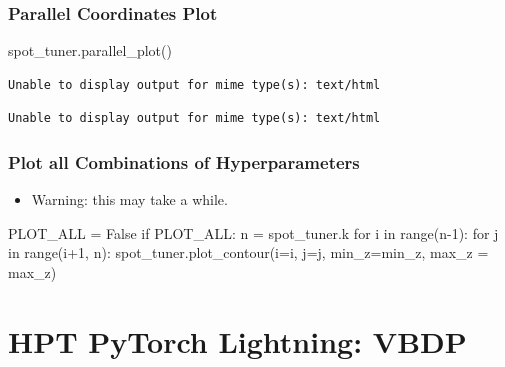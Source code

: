 \documentclass[
  letterpaper,
  DIV=11,
  numbers=noendperiod]{scrreprt}
\newenvironment{Shaded}{\begin{snugshade}}{\end{snugshade}}
\newcommand{\BuiltInTok}[1]{\textcolor[rgb]{0.00,0.23,0.31}{#1}}
\newcommand{\ControlFlowTok}[1]{\textcolor[rgb]{0.00,0.23,0.31}{#1}}
\newcommand{\DecValTok}[1]{\textcolor[rgb]{0.68,0.00,0.00}{#1}}
\newcommand{\KeywordTok}[1]{\textcolor[rgb]{0.00,0.23,0.31}{#1}}
\newcommand{\NormalTok}[1]{\textcolor[rgb]{0.00,0.23,0.31}{#1}}
\newcommand{\OperatorTok}[1]{\textcolor[rgb]{0.37,0.37,0.37}{#1}}
\newcommand{\VariableTok}[1]{\textcolor[rgb]{0.07,0.07,0.07}{#1}}
\providecommand{\tightlist}{%
  \setlength{\itemsep}{0pt}\setlength{\parskip}{0pt}}\usepackage{longtable,booktabs,array}
\begin{document}
\hypertarget{parallel-coordinates-plot-4}{%
\subsection{Parallel Coordinates
Plot}\label{parallel-coordinates-plot-4}}

\begin{Shaded}
\begin{Highlighting}[]
\NormalTok{spot\_tuner.parallel\_plot()}
\end{Highlighting}
\end{Shaded}

\begin{verbatim}
Unable to display output for mime type(s): text/html
\end{verbatim}

\begin{verbatim}
Unable to display output for mime type(s): text/html
\end{verbatim}

\hypertarget{plot-all-combinations-of-hyperparameters-5}{%
\subsection{Plot all Combinations of
Hyperparameters}\label{plot-all-combinations-of-hyperparameters-5}}

\begin{itemize}
\tightlist
\item
  Warning: this may take a while.
\end{itemize}

\begin{Shaded}
\begin{Highlighting}[]
\NormalTok{PLOT\_ALL }\OperatorTok{=} \VariableTok{False}
\ControlFlowTok{if}\NormalTok{ PLOT\_ALL:}
\NormalTok{    n }\OperatorTok{=}\NormalTok{ spot\_tuner.k}
    \ControlFlowTok{for}\NormalTok{ i }\KeywordTok{in} \BuiltInTok{range}\NormalTok{(n}\OperatorTok{{-}}\DecValTok{1}\NormalTok{):}
        \ControlFlowTok{for}\NormalTok{ j }\KeywordTok{in} \BuiltInTok{range}\NormalTok{(i}\OperatorTok{+}\DecValTok{1}\NormalTok{, n):}
\NormalTok{            spot\_tuner.plot\_contour(i}\OperatorTok{=}\NormalTok{i, j}\OperatorTok{=}\NormalTok{j, min\_z}\OperatorTok{=}\NormalTok{min\_z, max\_z }\OperatorTok{=}\NormalTok{ max\_z)}
\end{Highlighting}
\end{Shaded}

\hypertarget{sec-hyperparameter-tuning-lightning-31}{%
\chapter{HPT PyTorch Lightning:
VBDP}\label{sec-hyperparameter-tuning-lightning-31}}
\end{document}
